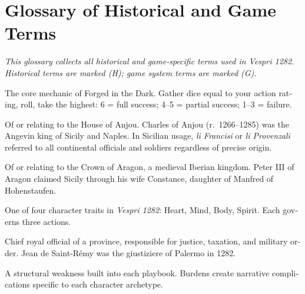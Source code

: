 
\chapter{Glossary of Historical and Game Terms}
\begin{english}

\textit{This glossary collects all historical and game-specific terms
used in \textit{Vespri 1282}. Historical terms are marked (H);
game system terms are marked (G).}

\secsep

\begin{description}[leftmargin=2em, style=nextline, font=\cinzel\color{oro}]

\item[Action Roll (G)] The core mechanic of Forged in the Dark. Gather
  dice equal to your action rating, roll, take the highest: 6 = full
  success; 4--5 = partial success; 1--3 = failure.

\item[Angevin (H)] Of or relating to the House of Anjou. Charles of
  Anjou (r.~1266--1285) was the Angevin king of Sicily and Naples.
  In Sicilian usage, \textit{li Francisi} or \textit{li Provenzali}
  referred to all continental officials and soldiers regardless of
  precise origin.

\item[Aragonese (H)] Of or relating to the Crown of Aragon, a medieval
  Iberian kingdom. Peter III of Aragon claimed Sicily through his wife
  Constance, daughter of Manfred of Hohenstaufen.

\item[Attribute (G)] One of four character traits in \textit{Vespri 1282}:
  Heart, Mind, Body, Spirit. Each governs three actions.

\item[Bailli / Giustiziere (H)] Chief royal official of a province,
  responsible for justice, taxation, and military order. Jean de
  Saint-Rémy was the giustiziere of Palermo in 1282.

\item[Burden (G)] A structural weakness built into each playbook.
  Burdens create narrative complications specific to each character
  archetype.


\end{description}
\end{english}
